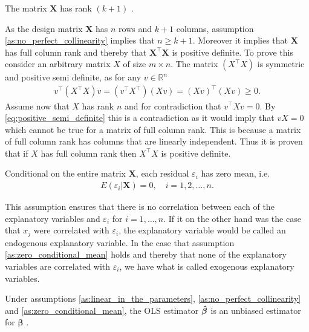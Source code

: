 \begin{assumption}\label{as:no_perfect_collinearity}
    The matrix $\mathbf{X}$ has rank $(k + 1)$ \cite[p. 810]{Wooldridge2012}.
\end{assumption}
As the design matrix $\mathbf{X}$ has $n$ rows and $k + 1$ columns, assumption \ref{as:no_perfect_collinearity} implies that $n \geq k + 1$.
Moreover it implies that $\mathbf{X}$ has full column rank and thereby that $\mathbf{X}^\top\mathbf{X}$ is positive definite.
To prove this consider an arbitrary matrix $X$ of size $m \times n$.
The matrix $(X^\top X)$ is symmetric and positive semi definite, as for any $v \in \mathbb{R}^n$
\begin{align}\label{eq:positive_semi_definite}
v^\top (X^\top X) v = (v^\top X^\top) (X v) = (X v)^\top (X v) \geq 0.
\end{align}
Assume now that $X$ has rank $n$ and for contradiction that $v^\top X v = 0$.
By \eqref{eq:positive_semi_definite} this is a contradiction as it would imply that $vX = 0$ which cannot be true for a matrix of full column rank.
This is because a matrix of full column rank has columns that are linearly independent.
Thus it is proven that if $X$ has full column rank then $X^\top X$ is positive definite.
\begin{assumption}\label{as:zero_conditional_mean}
    Conditional on the entire matrix $\mathbf{X}$, each residual $\varepsilon_i$ has zero mean, i.e. \cite[p. 810]{Wooldridge2012}
    \begin{align*}
        E(\varepsilon_i | \mathbf{X}) = 0, \quad i = 1, 2, \ldots, n.
    \end{align*}
\end{assumption}
This assumption ensures that there is no correlation between each of the explanatory variables and $\varepsilon_i$ for $i = 1, \ldots, n$.
If it on the other hand was the case that $x_j$ were correlated with $\varepsilon_i$, the explanatory variable would be called an endogenous explanatory variable.
In the case that assumption \ref{as:zero_conditional_mean} holds and thereby that none of the explanatory variables are correlated with $\varepsilon_i$, we have what is called exogenous explanatory variables.
\begin{theorem}
    Under assumptions \ref{as:linear_in_the_parameters}, \ref{as:no_perfect_collinearity} and \ref{as:zero_conditional_mean}, the OLS estimator $\operatorname{\boldsymbol{\hat{\beta}}}$ is an unbiased estimator for $\boldsymbol{\beta}$ \cite[p. 810]{Wooldridge2012}.
\end{theorem}\label{th:unbiasedness_of_ols}
